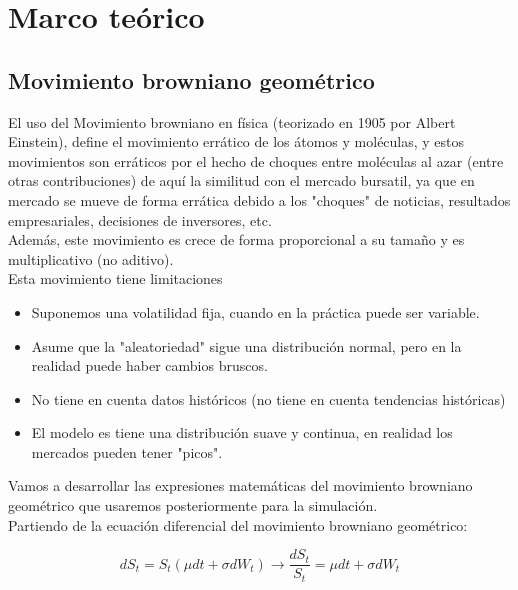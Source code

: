 \documentclass[12pt,a4paper]{article}
\begin{document}
\section{Marco teórico}
\subsection{Movimiento browniano geométrico}

El uso del Movimiento browniano en física (teorizado en 1905 por Albert Einstein), define el movimiento errático de los átomos y moléculas, y estos movimientos son erráticos por el hecho de choques entre moléculas al azar (entre otras contribuciones) \cite{antonio2013movimiento} de aquí la similitud con el mercado bursatil, ya que en mercado se mueve de forma errática debido a los "choques" de noticias, resultados empresariales, decisiones de inversores, etc. \\

Además, este movimiento es crece de forma proporcional a su tamaño y es multiplicativo (no aditivo). \\

Esta movimiento tiene limitaciones \cite{joshi2003concepts}

\begin{itemize}
 \item Suponemos una volatilidad fija, cuando en la práctica puede ser variable.
 \item Asume que la "aleatoriedad" sigue una distribución normal, pero en la realidad puede haber cambios bruscos.
 \item No tiene en cuenta datos históricos (no tiene en cuenta tendencias históricas)
  \item El modelo es tiene una distribución suave y continua, en realidad los mercados pueden tener "picos".


\end{itemize} 

Vamos a desarrollar las expresiones matemáticas del movimiento browniano geométrico que usaremos posteriormente para la simulación. \\

Partiendo de la ecuación diferencial del movimiento browniano geométrico:


\begin{equation}
 dS_{t} =S_{t} \left (  \mu dt + \sigma  dW_{t} \right ) \to  \frac{dS_{t}}{S_{t}} = \mu dt + \sigma dW_{t}
\end{equation}
\end{document}
